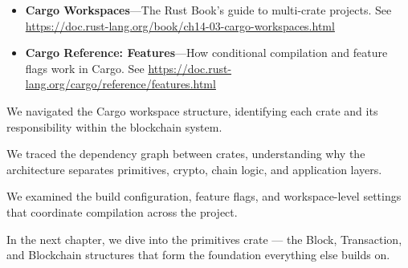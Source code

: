 \begin{itemize}
  \item \textbf{Cargo Workspaces}---The Rust Book's guide to multi-crate projects. See \url{https://doc.rust-lang.org/book/ch14-03-cargo-workspaces.html}
  \item \textbf{Cargo Reference: Features}---How conditional compilation and feature flags work in Cargo. See \url{https://doc.rust-lang.org/cargo/reference/features.html}
\end{itemize}

\begin{chaptersummary}
  \item We navigated the Cargo workspace structure, identifying each crate and its responsibility within the blockchain system.
  \item We traced the dependency graph between crates, understanding why the architecture separates primitives, crypto, chain logic, and application layers.
  \item We examined the build configuration, feature flags, and workspace-level settings that coordinate compilation across the project.
  \item In the next chapter, we dive into the primitives crate --- the Block, Transaction, and Blockchain structures that form the foundation everything else builds on.
\end{chaptersummary}
